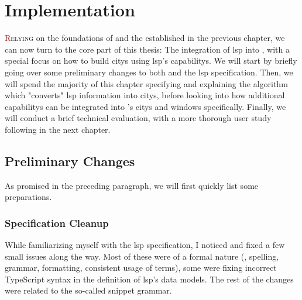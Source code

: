 \documentclass[../thesis]{subfiles}
\begin{document}
\chapter{Implementation}\label{ch:implementation}

\lettrine[lines=3]{\textcolor{Maroon}{R}}{elying} on the foundations of \SEE{} and the  established in the previous chapter, we can now turn to the core part of this thesis:
The integration of \gls{lsp} into \SEE{}, with a special focus on how to build \glspl{city} using \gls{lsp}'s \glspl{capability}.
We will start by briefly going over some preliminary changes to both \SEE{} and the \gls{lsp} specification.
Then, we will spend the majority of this chapter specifying and explaining the algorithm which "converts" \gls{lsp} information into \glspl{city}, before looking into how additional \glspl{capability} can be integrated into \SEE{}'s \glspl{city} and \glspl{window} specifically.
Finally, we will conduct a brief technical evaluation, with a more thorough user study following in the next chapter.

\section{Preliminary Changes}
As promised in the preceding paragraph, we will first quickly list some preparations.

\subsection{Specification Cleanup}
While familiarizing myself with the \gls{lsp} specification, I noticed and fixed a few small issues along the way.
Most of these were of a formal nature (\eg, spelling, grammar, formatting, consistent usage of terms), some were fixing incorrect TypeScript syntax in the definition of \gls{lsp}'s data models.
The rest of the changes were related to the so-called snippet grammar.
\end{document}
